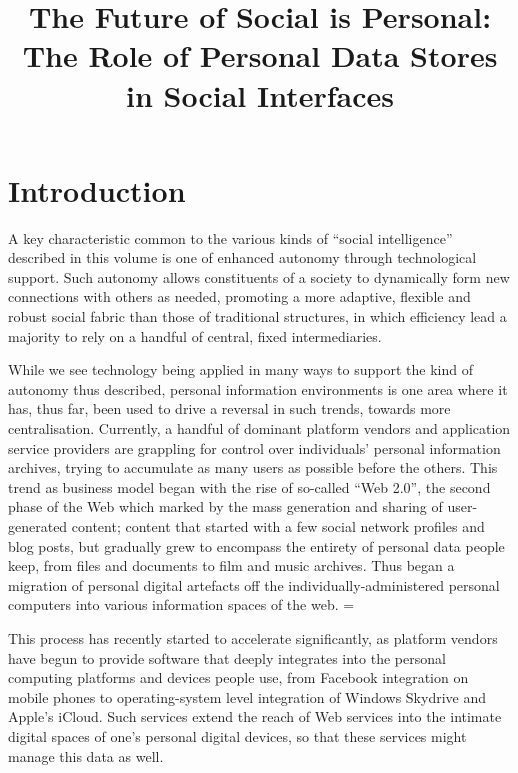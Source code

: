 \documentclass[runningheads,a4paper]{llncs}
\begin{document}
\title{The Future of Social is Personal: The Role of Personal Data Stores in Social Interfaces}


\maketitle

\section{Introduction}

A key characteristic common to the various kinds of ``social intelligence'' described in this volume is one of enhanced autonomy through technological support.  Such autonomy allows constituents of a society to dynamically form new connections with others as needed, promoting a more adaptive, flexible and robust social fabric than those of traditional structures, in which efficiency lead a majority to rely on a handful of central, fixed intermediaries.  

While we see technology being applied in many ways to support the kind of autonomy thus described, personal information environments is one area where it has, thus far, been used to drive a reversal in such trends, towards more centralisation. Currently, a handful of dominant platform vendors and application service providers are grappling for control over individuals' personal information archives, trying to accumulate as many users as possible before the others. This trend as business model began with the rise of so-called ``Web 2.0'', the second phase of the Web which marked by the mass generation and sharing of user-generated content; content that started with a few social network profiles and blog posts, but gradually grew to encompass the entirety of personal data people keep, from files and documents to film and music archives. Thus began a migration of personal digital artefacts off the individually-administered personal computers into various information spaces of the web.  =

This process has recently started to accelerate significantly, as platform vendors have begun to provide software that deeply integrates into the personal computing platforms and devices people use, from Facebook  integration on mobile phones to operating-system level integration of Windows Skydrive and Apple's iCloud.  Such services extend the reach of Web services into the intimate digital spaces of one's personal digital devices, so that these services might manage this data as well.
\end{document}

